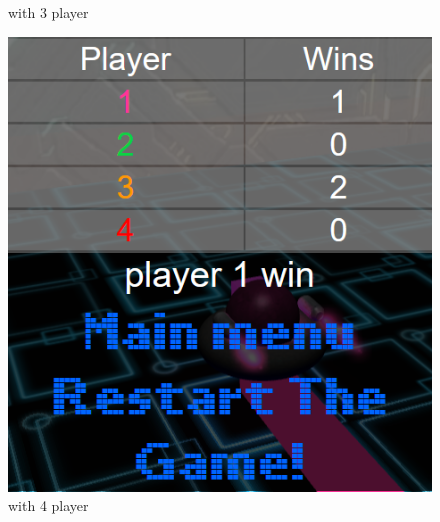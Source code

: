 \documentclass[11pt]{article}
\begin{document}
\begin{figure}
\begin{minipage}[b]{0.25\linewidth}
	 		\caption{with 3 player}
	 		\label{fig:endGameMenu3}
	 	\end{minipage}
	 	\begin{minipage}[b]{0.25\linewidth}
	 		\includegraphics[width=\linewidth]{endGameMenu4}
	 		\caption{with 4 player}
	 		\label{fig:endGameMenu4}
	 	\end{minipage}
	 \end{figure}
	 
\end{document}
